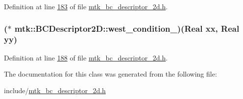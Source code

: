 Definition at line \hyperlink{mtk__bc__descriptor__2d_8h_source_l00183}{183} of file \hyperlink{mtk__bc__descriptor__2d_8h_source}{mtk\+\_\+bc\+\_\+descriptor\+\_\+2d.\+h}.

\hypertarget{classmtk_1_1BCDescriptor2D_a98bfe7ea4256d0777a6b19d1701645db}{
\subsubsection[{west\+\_\+condition\+\_\+}]{($\ast$ mtk\+::\+B\+C\+Descriptor2\+D\+::west\+\_\+condition\+\_\+)({\bf Real} xx, {\bf Real} yy)\hspace{0.3cm}{\ttfamily [private]}}}\label{classmtk_1_1BCDescriptor2D_a98bfe7ea4256d0777a6b19d1701645db}


Definition at line \hyperlink{mtk__bc__descriptor__2d_8h_source_l00188}{188} of file \hyperlink{mtk__bc__descriptor__2d_8h_source}{mtk\+\_\+bc\+\_\+descriptor\+\_\+2d.\+h}.



The documentation for this class was generated from the following file\+:\begin{DoxyCompactItemize}
\item 
include/\hyperlink{mtk__bc__descriptor__2d_8h}{mtk\+\_\+bc\+\_\+descriptor\+\_\+2d.\+h}\end{DoxyCompactItemize}
